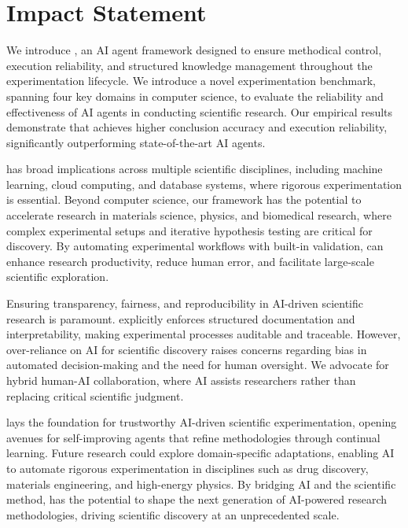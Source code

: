\section*{Impact Statement}
We introduce \sys, an AI agent framework designed to ensure methodical control, execution reliability, and structured knowledge management throughout the experimentation lifecycle.
We introduce a novel experimentation benchmark, spanning four key domains in computer science, to evaluate the reliability and effectiveness of AI agents in conducting scientific research. Our empirical results demonstrate that \sys achieves higher conclusion accuracy and execution reliability, significantly outperforming state-of-the-art AI agents.


\sys has broad implications across multiple scientific disciplines, including machine learning, cloud computing, and database systems, where rigorous experimentation is essential. Beyond computer science, our framework has the potential to accelerate research in materials science, physics, and biomedical research, where complex experimental setups and iterative hypothesis testing are critical for discovery. By automating experimental workflows with built-in validation, \sys can enhance research productivity, reduce human error, and facilitate large-scale scientific exploration.

Ensuring transparency, fairness, and reproducibility in AI-driven scientific research is paramount. \sys explicitly enforces structured documentation and interpretability, making experimental processes auditable and traceable. However, over-reliance on AI for scientific discovery raises concerns regarding bias in automated decision-making and the need for human oversight. We advocate for hybrid human-AI collaboration, where AI assists researchers rather than replacing critical scientific judgment.

\sys lays the foundation for trustworthy AI-driven scientific experimentation, opening avenues for self-improving agents that refine methodologies through continual learning. Future research could explore domain-specific adaptations, enabling AI to automate rigorous experimentation in disciplines such as drug discovery, materials engineering, and high-energy physics. By bridging AI and the scientific method, \sys has the potential to shape the next generation of AI-powered research methodologies, driving scientific discovery at an unprecedented scale.








